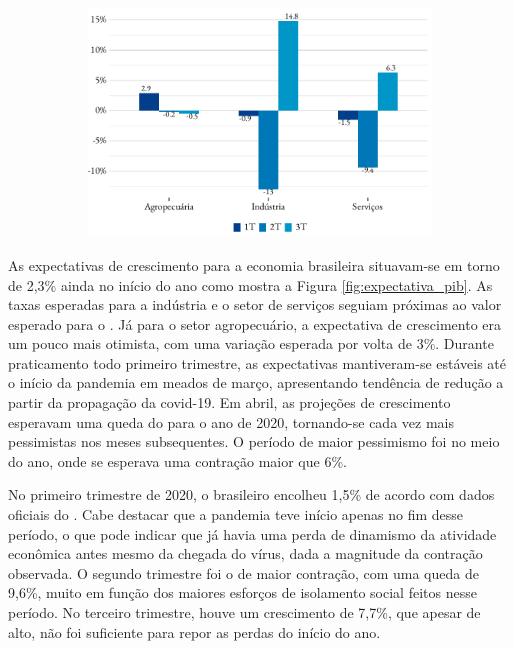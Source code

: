 \begin{figure}[!h]
\begin{subfigure}{\linewidth}
		\includegraphics{fig/pib_oferta.pdf}
		\notes{\trimestres[1-3]}
	\end{subfigure}
\end{figure}
\par As expectativas de crescimento para a economia brasileira situavam-se em torno de 2,3\% ainda no início do ano como mostra a Figura \ref{fig:expectativa_pib}. As taxas esperadas para a indústria e o setor de serviços seguiam próximas ao valor esperado para o . Já para o setor agropecuário, a expectativa de crescimento era um pouco mais otimista, com uma variação esperada por volta de 3\%. Durante praticamento todo primeiro trimestre, as expectativas mantiveram-se estáveis até o início da pandemia em meados de março, apresentando tendência de redução a partir da propagação da covid-19. Em abril, as projeções de crescimento esperavam uma queda do  para o ano de 2020, tornando-se cada vez mais pessimistas nos meses subsequentes. O período de maior pessimismo foi no meio do ano, onde se esperava uma contração maior que 6\%.
\par No primeiro trimestre de 2020, o  brasileiro encolheu 1,5\% de acordo com dados oficiais do . Cabe destacar que a pandemia teve início apenas no fim desse período, o que pode indicar que já havia uma perda de dinamismo da atividade econômica antes mesmo da chegada do vírus, dada a magnitude da contração observada. O segundo trimestre foi o de maior contração, com uma queda de 9,6\%, muito em função dos maiores esforços de isolamento social feitos nesse período. No terceiro trimestre, houve um crescimento de 7,7\%, que apesar de alto, não foi suficiente para repor as perdas do início do ano.

